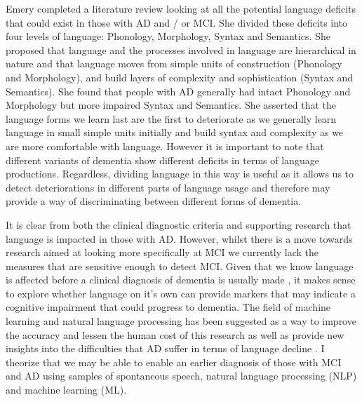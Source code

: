 \documentclass[10pt, letterpaper, twoside, openany]{thesis}
\begin{document}
\par
Emery \cite{Emery2000} completed a literature review looking at all the potential language deficits that could exist in those with AD and / or MCI. She divided these deficits into four levels of language: Phonology, Morphology, Syntax and Semantics. She proposed that language and the processes involved in language are hierarchical in nature and that language moves from simple units of construction (Phonology and Morphology), and build layers of complexity and sophistication (Syntax and Semantics). She found that people with AD generally had intact Phonology and Morphology but more impaired Syntax and Semantics. She asserted that the language forms we learn last are the first to deteriorate as we generally learn language in small simple units initially and build syntax and complexity as we are more comfortable with language. However it is important to note that different variants of dementia show different deficits in terms of language productions. Regardless, dividing language in this way is useful as it allows us to detect deteriorations in different parts of language usage and therefore may provide a way of discriminating between different forms of dementia. 
\par
It is clear from both the clinical diagnostic criteria and supporting research that language is impacted in those with AD. However, whilst there is a move towards research aimed at looking more specifically at MCI we currently lack the measures that are sensitive enough to detect MCI. Given that we know language is affected before a clinical diagnosis of dementia is usually made \cite{Berisha2015, Snowdon1996, Le2011}, it makes sense to explore whether language on it's own can provide markers that may indicate a cognitive impairment that could progress to dementia. The field of machine learning and natural language processing has been suggested as a way to improve the accuracy and lessen the human cost of this research as well as provide new insights into the difficulties that AD suffer in terms of language decline \cite{Boschi2017}. I theorize that we may be able to enable an earlier diagnosis of those with MCI and AD using samples of spontaneous speech, natural language processing (NLP) and machine learning (ML).
\par
\end{document}

